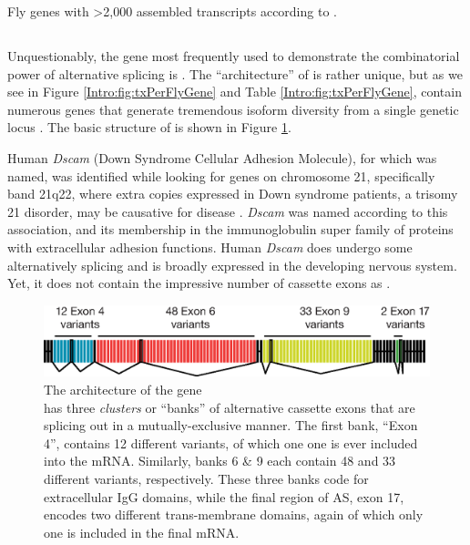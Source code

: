     \begin{table} %
      \caption{Fly genes with >2,000 assembled transcripts according to \citep{Brown2014}.}
      \label{Intro:tab:FlyGenesWithManyTx}
      
      \end{table}

  \subsection{\flies{} \dscam{}}\label{Intro:subsec:Dscam}

    Unquestionably, the gene most frequently used to demonstrate the combinatorial power of alternative splicing is \flies{} \dscam{}. The ``architecture'' of \dscam{} is rather unique, but as we see in Figure \ref{Intro:fig:txPerFlyGene} and Table \ref{Intro:fig:txPerFlyGene}, \flies{} contain numerous genes that generate tremendous isoform diversity from a single genetic locus \citep{Brown2014}. The basic structure of \dscam{} is shown in Figure \ref{Intro:fig:DscamArch}.

    Human \textit{Dscam} (Down Syndrome Cellular Adhesion Molecule), for which \dscam{} was named, was identified while looking for genes on chromosome 21, specifically band 21q22, where extra copies expressed in Down syndrome patients, a trisomy 21 disorder, may be causative for disease \citep{Yamakawa1998a}. \textit{Dscam} was named according to this association, and its membership in the immunoglobulin super family of proteins with extracellular adhesion functions. Human \textit{Dscam} does undergo some alternatively splicing and is broadly expressed in the developing nervous system. Yet, it does not contain the impressive number of cassette exons as \dscam{}.

    \begin{figure} %
      \centering 
      \includegraphics{Figures/Intro/DscamArch.eps}
      \caption[The architecture of the \flies{} gene \dscam{}]
      {
        The architecture of the \flies{} gene \dscam{}\\[0.25cm]
        \dscam{} has three \textit{clusters} or ``banks'' of alternative cassette exons that are splicing out in a mutually-exclusive manner. The first bank, ``Exon 4'', contains 12 different variants, of which one one is ever included into the mRNA. Similarly, banks 6 \& 9 each contain 48 and 33 different variants, respectively. These three banks code for extracellular IgG domains, while the final region of AS, exon 17, encodes two different trans-membrane domains, again of which only one is included in the final mRNA.
          }
        \label{Intro:fig:DscamArch}
        \end{figure}

